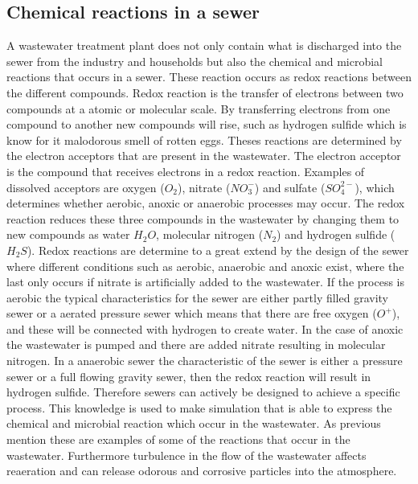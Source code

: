\subsection{Chemical reactions in a sewer}\label{subse:chemical_reactions_in_a_sewer}
A wastewater treatment plant does not only contain what is discharged into the sewer from the industry and households but also the chemical and microbial reactions that occurs in a sewer. These reaction occurs as redox reactions between the different compounds. Redox reaction is the transfer of electrons between two compounds at a atomic or molecular scale. By transferring electrons from one compound to another new compounds will rise, such as hydrogen sulfide which is know for it malodorous smell of rotten eggs. Theses reactions are determined by the electron acceptors that are present in the wastewater. The electron acceptor is the compound that receives electrons in a redox reaction. Examples of dissolved acceptors are oxygen ($O_2$), nitrate ($NO^-_3$) and sulfate ($SO^{2-}_4$), which determines whether aerobic, anoxic or anaerobic processes may occur. The redox reaction reduces these three compounds in the wastewater by changing them to new compounds as water $H_2O$, molecular nitrogen ($N_2$) and hydrogen sulfide ($H_2S$). Redox reactions are determine to a great extend by the design of the sewer where different conditions such as aerobic, anaerobic and anoxic exist, where the last only occurs if nitrate is artificially added to the wastewater. If the process is aerobic the typical characteristics for the sewer are either partly filled gravity sewer or a aerated pressure sewer which means that there are free oxygen ($O^+$), and these will be connected with hydrogen to create water. In the case of anoxic the wastewater is pumped and there are added nitrate resulting in molecular nitrogen. In a anaerobic sewer the characteristic of the sewer is either a pressure sewer or a full flowing gravity sewer, then the redox reaction will result in hydrogen sulfide. Therefore sewers can actively be designed to achieve a specific process. This knowledge is used to make simulation that is able to express the chemical and microbial reaction which occur in the wastewater. As previous mention these are examples of some of the reactions that occur in the wastewater. Furthermore turbulence in the flow of the wastewater affects reaeration and can release odorous and corrosive particles into the atmosphere.    


